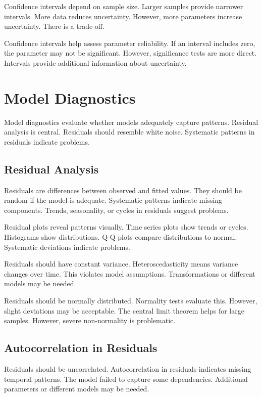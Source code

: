 Confidence intervals depend on sample size. Larger samples provide narrower intervals. More data reduces uncertainty. However, more parameters increase uncertainty. There is a trade-off.

Confidence intervals help assess parameter reliability. If an interval includes zero, the parameter may not be significant. However, significance tests are more direct. Intervals provide additional information about uncertainty.

\section{Model Diagnostics}

Model diagnostics evaluate whether models adequately capture patterns. Residual analysis is central. Residuals should resemble white noise. Systematic patterns in residuals indicate problems.

\subsection{Residual Analysis}

Residuals are differences between observed and fitted values. They should be random if the model is adequate. Systematic patterns indicate missing components. Trends, seasonality, or cycles in residuals suggest problems.

Residual plots reveal patterns visually. Time series plots show trends or cycles. Histograms show distributions. Q-Q plots compare distributions to normal. Systematic deviations indicate problems.

Residuals should have constant variance. Heteroscedasticity means variance changes over time. This violates model assumptions. Transformations or different models may be needed.

Residuals should be normally distributed. Normality tests evaluate this. However, slight deviations may be acceptable. The central limit theorem helps for large samples. However, severe non-normality is problematic.

\subsection{Autocorrelation in Residuals}

Residuals should be uncorrelated. Autocorrelation in residuals indicates missing temporal patterns. The model failed to capture some dependencies. Additional parameters or different models may be needed.

